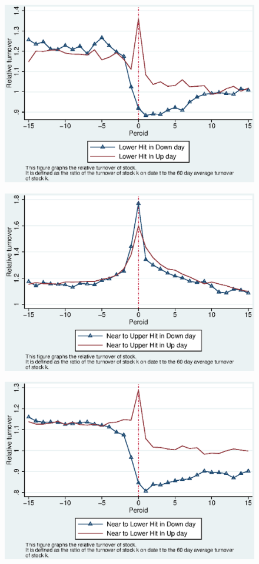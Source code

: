 \documentclass[12pt]{article}
\begin{document}
\begin{figure}[htbp]
\centering
\includegraphics[width=0.7\linewidth]{LPNRT.eps}
\caption{}
\label{fig:LPNRT}
\end{figure}

\begin{figure}[htbp]
\centering
\includegraphics[width=0.7\linewidth]{CUPNRT.eps}
\caption{}
\label{fig:CUPNRT}
\end{figure}

\begin{figure}[htbp]
\centering
\includegraphics[width=0.7\linewidth]{CLPNRT.eps}
\caption{}
\label{fig:CLPNRT}
\end{figure}
\end{document}
